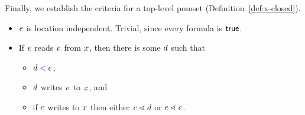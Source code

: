 Finally, we establish the criteria for a top-level pomset
(Definition~\ref{def:x-closed}).
\begin{itemize}
\item $e$ is location independent. Trivial, since every formula is $\mathsf{true}$.
\item If $e$ reads $v$ from $x$, then there is some $d$ such that
  \begin{itemize}
  \item $d \mathrel{{\color{blue}<}} e$,  
  \item $d$ writes $v$ to $x$, and
  \item if $c$ writes to $x$
    then either $c \lessdot d$ or $e \lessdot c$.
  \end{itemize}    
\end{itemize}

